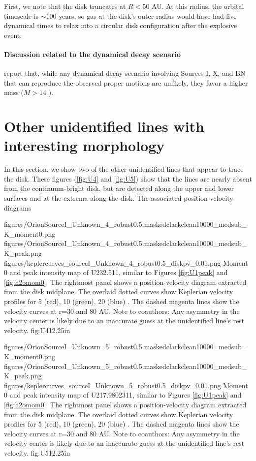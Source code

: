 \documentclass[twocolumn]{aastex61}
\begin{document}
First, we note that the disk truncates at $R<50$ AU.  At this radius, the
orbital timescale is $\sim100$ years, so gas at the disk's outer radius would
have had five dynamical times to relax into a circular disk configuration after the
explosive event.

\paragraph{Discussion related to the dynamical decay scenario}
\citep{Farias2017a} report that, while any dynamical decay scenario
involving Sources I, X, and BN that can reproduce the observed 
proper motions are unlikely, they favor a higher mass ($M>14$ \msun).



\appendix
\section{Other unidentified lines with interesting morphology}
In this section, we show two of the other unidentified lines that appear to trace
the disk.  These figures (\ref{fig:U4} and \ref{fig:U5}) show that the lines
are nearly absent from the continuum-bright disk, but are detected along the upper and
lower surfaces and at the extrema along the disk.  The associated position-velocity diagrams

\FigureThree
{{figures/OrionSourceI_Unknown_4_robust0.5.maskedclarkclean10000_medsub_K_moment0}.png}
{{figures/OrionSourceI_Unknown_4_robust0.5.maskedclarkclean10000_medsub_K_peak}.png}
{{figures/keplercurves_sourceI_Unknown_4_robust0.5_diskpv_0.01}.png}
{Moment 0 and peak intensity map of U232.511, similar to Figures \ref{fig:U1peak} and \ref{fig:h2omom0}.
The rightmost panel shows a position-velocity diagram extracted from the disk midplane.
The overlaid dotted curves show Keplerian velocity profiles for 5 (red), 10 (green), 20 (blue) \msun.
The dashed magenta lines show the velocity curves at r=30 and 80 AU.
{\color{red} Note to coauthors: Any asymmetry in the velocity center is likely due to an inaccurate
guess at the unidentified line's rest velocity.}
}
{fig:U4}{1}{2.25in}

\FigureThree
{{figures/OrionSourceI_Unknown_5_robust0.5.maskedclarkclean10000_medsub_K_moment0}.png}
{{figures/OrionSourceI_Unknown_5_robust0.5.maskedclarkclean10000_medsub_K_peak}.png}
{{figures/keplercurves_sourceI_Unknown_5_robust0.5_diskpv_0.01}.png}
{Moment 0 and peak intensity map of U217.9802311, similar to Figures \ref{fig:U1peak} and \ref{fig:h2omom0}.
The rightmost panel shows a position-velocity diagram extracted from the disk midplane.
The overlaid dotted curves show Keplerian velocity profiles for 5 (red), 10 (green), 20 (blue) \msun.
The dashed magenta lines show the velocity curves at r=30 and 80 AU.
{\color{red} Note to coauthors: Any asymmetry in the velocity center is likely due to an inaccurate
guess at the unidentified line's rest velocity.}
}
{fig:U5}{1}{2.25in}
\end{document}
